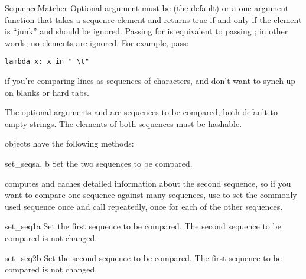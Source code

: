 \begin{classdesc}{SequenceMatcher}{}
  Optional argument  must be  (the default) or
  a one-argument function that takes a sequence element and returns
  true if and only if the element is ``junk'' and should be ignored.
  Passing  for  is equivalent to passing
  ; in other words, no elements are ignored.  For
  example, pass:

\begin{verbatim}
lambda x: x in " \t"
\end{verbatim}

  if you're comparing lines as sequences of characters, and don't want
  to synch up on blanks or hard tabs.

  The optional arguments  and  are sequences to be
  compared; both default to empty strings.  The elements of both
  sequences must be hashable.
\end{classdesc}


 objects have the following methods:

\begin{methoddesc}{set_seqs}{a, b}
  Set the two sequences to be compared.
\end{methoddesc}

 computes and caches detailed information about
the second sequence, so if you want to compare one sequence against
many sequences, use  to set the commonly used
sequence once and call  repeatedly, once for each
of the other sequences.

\begin{methoddesc}{set_seq1}{a}
  Set the first sequence to be compared.  The second sequence to be
  compared is not changed.
\end{methoddesc}

\begin{methoddesc}{set_seq2}{b}
  Set the second sequence to be compared.  The first sequence to be
  compared is not changed.
\end{methoddesc}

